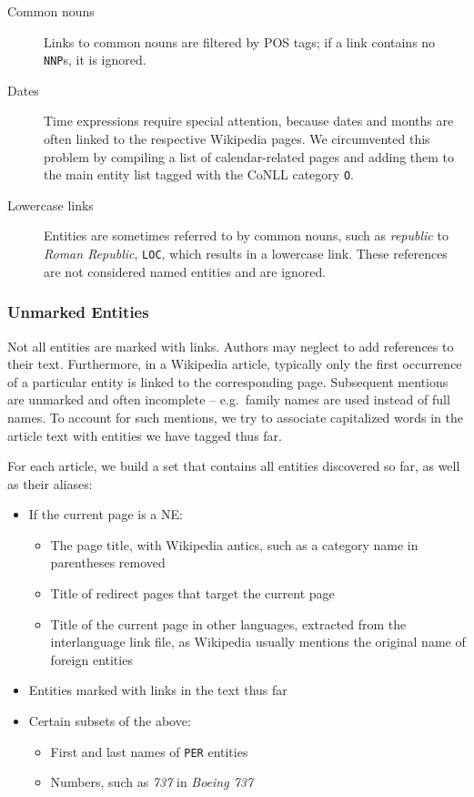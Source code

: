 \documentclass[11pt]{article}
\begin{document}
\begin{description}
\item[Common nouns] Links to common nouns are filtered by POS tags; if a link contains no \texttt{NNP}s, it is ignored.
\item[Dates] Time expressions require special attention, because dates and months are often linked to the respective Wikipedia pages. We circumvented this problem by compiling a list of calendar-related pages and adding them to the main entity list tagged with the CoNLL category \texttt{O}. 
\item[Lowercase links] Entities are sometimes referred to by common nouns, such as \textit{republic} to \textit{Roman Republic}, \texttt{LOC}, which results in a lowercase link. These references are not considered named entities and are ignored.
\end{description}

\subsubsection{Unmarked Entities}

Not all entities are marked with links. Authors may neglect to add references to their text. Furthermore, in a Wikipedia article, typically only the first occurrence of a particular entity is linked to the corresponding page. Subsequent mentions are unmarked and often incomplete -- e.g.~family names are used instead of full names. To account for such mentions, we try to associate capitalized words in the article text with entities we have tagged thus far.

For each article, we build a set that contains all entities discovered so far, as well as their aliases:
\begin{itemize}
\item If the current page is a NE:
  \begin{itemize}
  \item The page title, with Wikipedia antics, such as a category name in parentheses removed
  \item Title of redirect pages that target the current page
  \item Title of the current page in other languages, extracted from the interlanguage link file, as Wikipedia usually mentions the original name of foreign entities
  \end{itemize}
\item Entities marked with links in the text thus far
\item Certain subsets of the above:
  \begin{itemize}
  \item First and last names of \texttt{PER} entities
  \item Numbers, such as \textit{737} in \textit{Boeing 737}
  \end{itemize}
\end{itemize}
\end{document}
